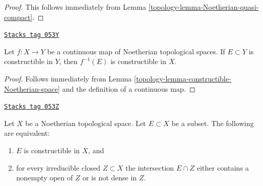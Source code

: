 \begin{proof}

This follows immediately from
Lemma \ref{topology-lemma-Noetherian-quasi-compact}.
\end{proof}

\begin{lemma}
\label{topology-lemma-constructible-map-Noetherian}
\href{https://stacks.math.columbia.edu/tag/053Y}{\texttt{Stacks tag 053Y}}

Let $f : X \to Y$ be a continuous map of Noetherian topological spaces.
If $E \subset Y$ is constructible in $Y$, then $f^{-1}(E)$ is constructible
in $X$.
\end{lemma}

\begin{proof}

Follows immediately from
Lemma \ref{topology-lemma-constructible-Noetherian-space}
and the definition of a continuous map.
\end{proof}

\begin{lemma}
\label{topology-lemma-characterize-constructible-Noetherian}
\href{https://stacks.math.columbia.edu/tag/053Z}{\texttt{Stacks tag 053Z}}

Let $X$ be a Noetherian topological space.
Let $E \subset X$ be a subset.
The following are equivalent:
\begin{enumerate}
\item $E$ is constructible in $X$, and
\item for every irreducible closed $Z \subset X$ the intersection
$E \cap Z$ either contains a nonempty open of $Z$ or is not dense in $Z$.
\end{enumerate}
\end{lemma}

